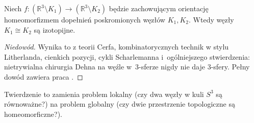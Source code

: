 \begin{theorem}
%
%
%
    Niech $f \colon (\mathbb R^3 \setminus K_1) \to (\mathbb R^3 \setminus K_2)$ będzie zachowującym orientację homeomorfizmem dopełnień poskromionych węzłów $K_1, K_2$.
    Wtedy węzły $K_1 \cong K_2$ są izotopijne.
\end{theorem}

\begin{proof}[Niedowód]
    Wynika to z teorii Cerfa, kombinatorycznych technik w stylu Litherlanda, cienkich pozycji, cykli Scharlemanna i~ogólniejszego stwierdzenia: nietrywialna chirurgia Dehna na węźle w~3-sferze nigdy nie daje 3-sfery.
%
%
%
    Pełny dowód zawiera praca \cite{gordon1989}.
\end{proof}

Twierdzenie to zamienia problem lokalny (czy dwa węzły w kuli $S^3$ są równoważne?) na problem globalny (czy dwie przestrzenie topologiczne są homeomorficzne?).
%


\color{white}
